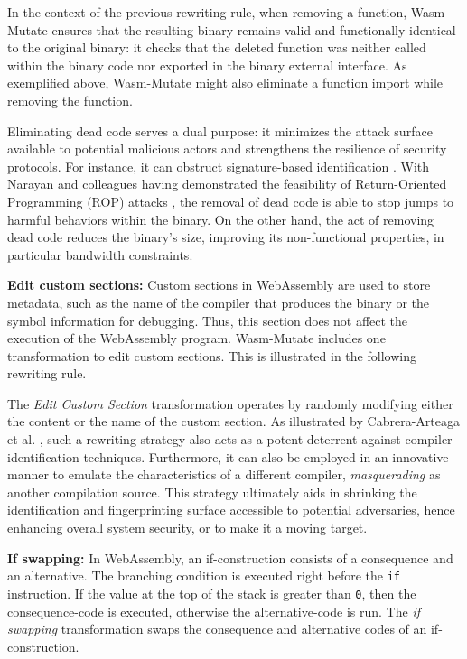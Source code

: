 \documentclass[a4paper,fleqn]{cas-dc}
\newcommand{\tool}{{\sc Wasm-Mutate}\xspace}
\begin{document}


In the context of the previous rewriting rule, when removing a function, \tool ensures that the resulting binary remains valid and functionally identical to the original binary: it checks  that the deleted function was neither called within the binary code nor exported in the binary external interface. 
As exemplified above, \tool might also eliminate a function import while removing the function. 

Eliminating dead code serves a dual purpose: it minimizes the attack surface available to potential malicious actors \cite{236200} and strengthens the resilience of security protocols. 
For instance, it can obstruct signature-based identification \cite{CABRERAARTEAGA2023103296}.
With Narayan and colleagues having demonstrated the feasibility of Return-Oriented Programming (ROP) attacks \cite{Swivel}, the removal of dead code is able to stop jumps to harmful behaviors within the binary. 
On the other hand, the act of removing dead code  reduces the binary's size, improving its non-functional properties, in particular bandwidth constraints. 


\textbf{Edit custom sections:}
Custom sections in WebAssembly are used to store metadata, such as the name of the compiler that produces the binary or the symbol information for debugging.
Thus, this section does not affect the execution of the WebAssembly program.
\tool includes one transformation to edit custom sections. 
This is illustrated in the following rewriting rule. 



The \emph{Edit Custom Section} transformation operates by randomly modifying either the content or the name of the custom section. 
As illustrated by Cabrera-Arteaga et al. \cite{CABRERAARTEAGA2023103296}, such a rewriting strategy also acts as a potent deterrent against compiler identification techniques.
Furthermore, it can also be employed in an innovative manner to emulate the characteristics of a different compiler, \emph{masquerading} as another compilation source. 
This strategy ultimately aids in shrinking the identification and fingerprinting surface accessible to potential adversaries, hence enhancing overall system security, or to make it a moving target.



\textbf{If swapping:} In WebAssembly, an if-construction consists of a consequence and an alternative. The branching condition is executed right before the \texttt{if} instruction.
If the value at the top of the stack is greater than \texttt{0}, then the consequence-code is executed, otherwise the alternative-code is run.
The \emph{if swapping} transformation swaps the consequence and alternative codes of an if-construction.
\end{document}
